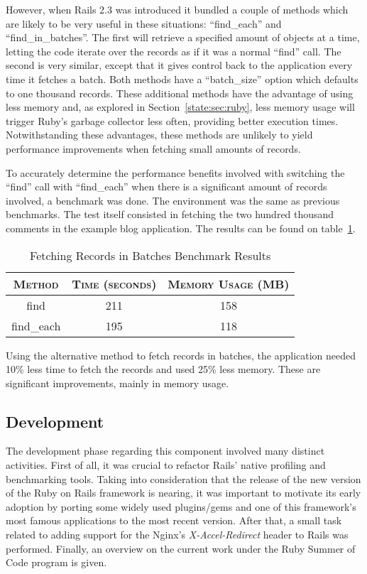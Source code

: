 However, when Rails 2.3 was introduced it bundled a couple of methods which are likely to be very useful in these situations: ``find\_each'' and ``find\_in\_batches''. The first will retrieve a specified amount of objects at a time, letting the code iterate over the records as if it was a normal ``find'' call. The second is very similar, except that it gives control back to the application every time it fetches a batch. Both methods have a ``batch\_size'' option which defaults to one thousand records. These additional methods have the advantage of using less memory and, as explored in Section~\ref{state:sec:ruby}, less memory usage will trigger Ruby's garbage collector less often, providing better execution times. Notwithstanding these advantages, these methods are unlikely to yield performance improvements when fetching small amounts of records.

To accurately determine the performance benefits involved with switching the ``find'' call with ``find\_each'' when there is a significant amount of records involved, a benchmark was done. The environment was the same as previous benchmarks. The test itself consisted in fetching the two hundred thousand comments in the example blog application. The results can be found on table~\ref{tab:fetch_in_batches}.
\begin{table}[h!t]
  \centering
  \caption{Fetching Records in Batches Benchmark Results}
  \label{tab:fetch_in_batches}
  
  \begin{tabular}{c|c|c}
  
    \textbf{\textsc{Method}} & \textbf{\textsc{Time (seconds)}} & \textbf{\textsc{Memory Usage (MB)}} \\ \hline
    find & 211 & 158 \\ \hline
    find\_each & 195 & 118 \\
  \end{tabular}
\end{table}

Using the alternative method to fetch records in batches, the application needed 10\% less time to fetch the records and used 25\% less memory. These are significant improvements, mainly in memory usage.

\subsection{Development}
The development phase regarding this component involved many distinct activities. First of all, it was crucial to refactor Rails' native profiling and benchmarking tools. Taking into consideration that the release of the new version of the Ruby on Rails framework is nearing, it was important to motivate its early adoption by porting some widely used plugins/gems and one of this framework's most famous applications to the most recent version. After that, a small task related to adding support for the Nginx's \textit{X-Accel-Redirect} header to Rails was performed. Finally, an overview on the current work under the Ruby Summer of Code program is given.


